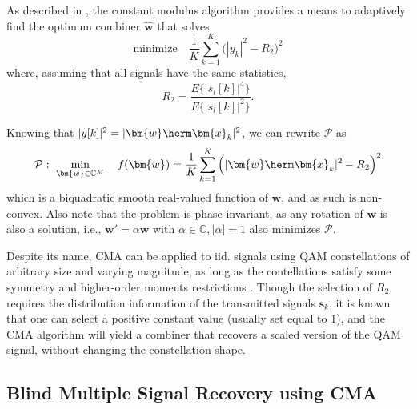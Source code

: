 As described in \cite{Godard1980cma}, the constant modulus algorithm provides a means to adaptively find the optimum combiner $\bm{\hat{w}}$ that solves 
\begin{equation}
\text{minimize}\quad\frac{1}{K}\sum_{k=1}^K\Big(|y_k|^2-R_2\Big)^2 \label{eqn:cma_orig}
\end{equation}
where, assuming that all signals have the same statistics, 
\begin{equation}
R_2 = \frac{E\{|s_l[k]|^4\}}{E\{|s_l[k]|^2\}}. \label{eqn:r2_orig}
\end{equation}

Knowing that $|y[k]|^2=|\bm{w}\herm\bm{x}_k|^2$, we can rewrite $\mathcal{P}$ as
\begin{eqnarray}%
\mathcal{P}:\,\,\min_{\bm{w}\in\mathbb{C}^M}\quad f(\bm{w})=\displaystyle{\frac{1}{K}\sum_{k=1}^K\Big(|\bm{w}\herm\bm{x}_k|^2-R_2\Big)^2} \label{eqn:cma}
\end{eqnarray}
which is a biquadratic smooth real-valued function of $\bm{w}$, and as such is non-convex. Also note that the problem is phase-invariant, as any rotation of $\bm{w}$ is also a solution, i.e., $\bm{w}'=\alpha\bm{w}$ with $\alpha\in\mathbb{C},|\alpha|=1$ also minimizes $\mathcal{P}$. 

Despite its name, CMA can be applied to iid. signals using QAM constellations of arbitrary size and varying magnitude, as long as the contellations satisfy some symmetry and higher-order moments restrictions \cite{Ding2000}.
Though the selection of $R_2$ requires the distribution information of the transmitted signals $\bm{s}_k$, it is known that one can select a positive constant value (usually set equal to 1), and the CMA algorithm will yield a combiner that recovers a scaled version of the QAM signal, without changing the constellation shape. 


\subsection{Blind Multiple Signal Recovery using CMA}

